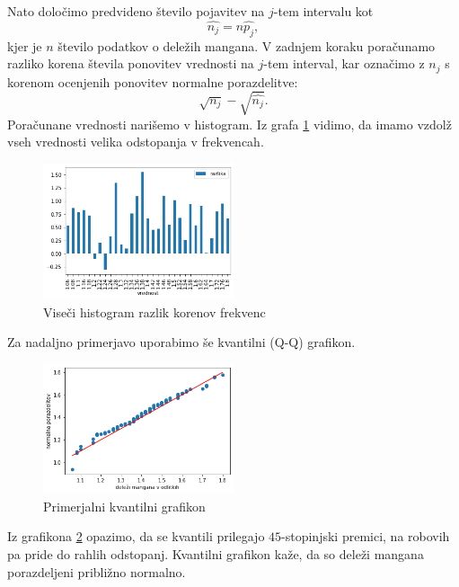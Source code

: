 \documentclass{article}
\begin{document}
Nato določimo predvideno število pojavitev na $j$-tem intervalu kot
\begin{equation}
    \hat{n_j} = n\hat{p_j},
\end{equation}
kjer je $n$ število podatkov o deležih mangana.
V zadnjem koraku poračunamo razliko korena števila ponovitev vrednosti na $j$-tem interval,
kar označimo z $n_j$ s korenom
ocenjenih ponovitev normalne porazdelitve:
\begin{equation}
    \sqrt{n_j} - \sqrt{\hat{n_j}}.
\end{equation}
Poračunane vrednosti narišemo v histogram.
Iz grafa \ref{2B} vidimo, da imamo vzdolž vseh vrednosti velika odstopanja v frekvencah.
\begin{figure}[H]
    \begin{center}
        \includegraphics*[width=0.5\textwidth]{figure2B.png}
        \caption{Viseči histogram razlik korenov frekvenc}
        \label{2B}
    \end{center}
\end{figure}



Za nadaljno primerjavo uporabimo še kvantilni (Q-Q) grafikon. 
\begin{figure}[H]
    \begin{center}
        \includegraphics*[width=0.5\textwidth]{figure2C.png}
        \caption{Primerjalni kvantilni grafikon}
        \label{2C}
    \end{center}
\end{figure}

Iz grafikona \ref{2C} opazimo, da se kvantili prilegajo $45$-stopinjski premici, na robovih pa pride do 
rahlih odstopanj. Kvantilni grafikon kaže, da so deleži mangana porazdeljeni približno normalno.
\end{document}

